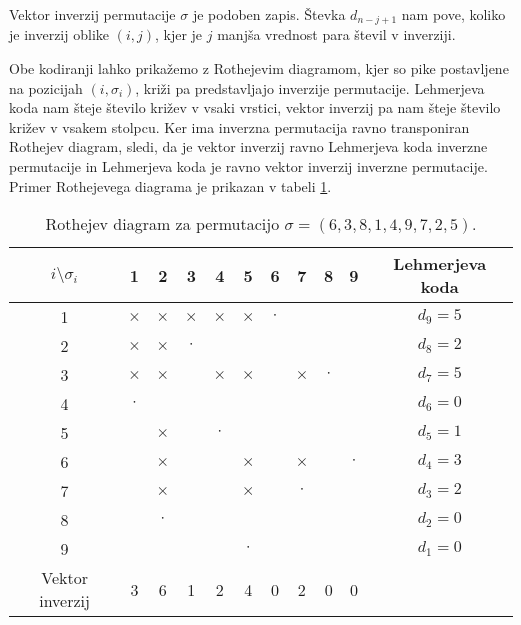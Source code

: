 \documentclass[a4paper, 12pt]{book}
\begin{document}
Vektor inverzij permutacije $\sigma$ je podoben zapis. Števka $d_{n-j+1}$ nam pove, koliko je inverzij oblike $(i, j)$, kjer je $j$ manjša vrednost para števil v inverziji.

Obe kodiranji lahko prikažemo z Rothejevim diagramom, kjer so pike postavljene na pozicijah $(i, \sigma_i)$, križi pa predstavljajo inverzije permutacije. Lehmerjeva koda nam šteje število križev v vsaki vrstici, vektor inverzij pa nam šteje število križev v vsakem stolpcu. Ker ima inverzna permutacija ravno transponiran Rothejev diagram, sledi, da je vektor inverzij ravno Lehmerjeva koda inverzne permutacije in Lehmerjeva koda je ravno vektor inverzij inverzne permutacije. Primer Rothejevega diagrama je prikazan v tabeli \ref{tbl:rothejev_diagram}.

\begin{table}[h]
    \begin{center}
        \begin{tabular}{ |c|c|c|c|c|c|c|c|c|c|c| } 
        \hline
            $i \setminus \sigma_i$ & 1 & 2 & 3 & 4 & 5 & 6 & 7 & 8 & 9 & Lehmerjeva koda  \\ 
        \hline
            1 & $\times$ & $\times$ & $\times$ & $\times$ & $\times$ & $\cdot$ & & & & $d_9 = 5$  \\ 
        \hline
            2 & $\times$ & $\times$ & $\cdot$ & & & & & & & $d_8 = 2$  \\ 
        \hline
            3 & $\times$ & $\times$ & & $\times$ & $\times$ & & $\times$ & $\cdot$ & & $d_7 = 5$  \\ 
        \hline
            4 & $\cdot$ & & & & & & & & & $d_6 = 0$  \\ 
        \hline
            5 & & $\times$ & & $\cdot$ & & & & & & $d_5 = 1$  \\ 
        \hline
            6 & & $\times$ & & & $\times$ & & $\times$ & & $\cdot$ & $d_4 = 3$  \\ 
        \hline
            7 & & $\times$ & & & $\times$ & & $\cdot$ & & & $d_3 = 2$  \\ 
        \hline
            8 & & $\cdot$ & & & & & & & & $d_2 = 0$  \\ 
        \hline
            9 & & & & & $\cdot$ & & & & & $d_1 = 0$  \\ 
        \hline
            Vektor inverzij & 3 & 6 & 1 & 2 & 4 & 0 & 2 & 0 & 0 &  \\ 
        \hline
        \end{tabular}
    \end{center}
    \caption{ Rothejev diagram za permutacijo $\sigma = (6, 3, 8, 1, 4, 9, 7, 2, 5)$. }
    \label{tbl:rothejev_diagram}
\end{table}
\end{document}
